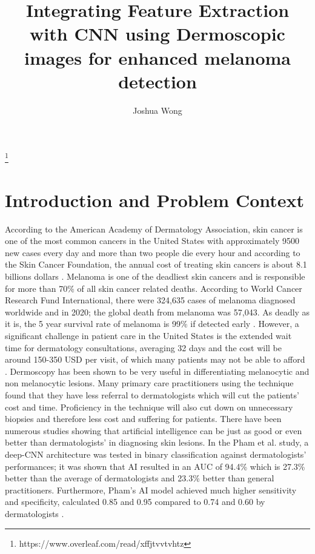 \documentclass[10pt,twocolumn]{article}
\title{Integrating Feature Extraction with CNN using Dermoscopic images for enhanced melanoma detection
}
\author{Joshua Wong}
\affiliation{Occidental College}
\begin{document}
\maketitle
\footnote{https://www.overleaf.com/read/xffjtvvtvhtz}

\section{Introduction and Problem Context}

According to the American Academy of Dermatology Association, skin cancer is one of the most common cancers in the United States with approximately 9500 new cases every day and more than two people die every hour and according to the Skin Cancer Foundation, the annual cost of treating skin cancers is about 8.1 billions dollars \cite{AmericanAcademy}.
\newline
\newline
Melanoma is one of the deadliest skin cancers and is responsible for more than 70\% of all skin cancer related deaths. According to World Cancer Research Fund International, there were 324,635 cases of melanoma diagnosed worldwide and in 2020; the global death from melanoma was 57,043. As deadly as it is, the 5 year survival rate of melanoma is 99\% if detected early \cite{MelanomaIntro}. However, a significant challenge in patient care in the United States is the extended wait time for dermatology consultations, averaging 32 days \cite{Alexander} and the cost will be around 150-350 USD per visit, of which many patients may not be able to afford \cite{MiiSkin_2023}.
\newline
\newline
Dermoscopy has been shown to be very useful in differentiating melanocytic and non melanocytic lesions. Many primary care practitioners using the technique found that they have less referral to dermatologists which will cut the patients’ cost and time. Proficiency in the technique will also cut down on unnecessary biopsies and therefore less cost and suffering for patients. 
\newline
\newline
There have been numerous studies showing that artificial intelligence can be just as good or even better than dermatologists’ in diagnosing skin lesions. In the Pham et al. study, a deep-CNN architecture was tested in binary classification against dermatologists’ performances; it was shown that AI resulted in an AUC of 94.4\% which is 27.3\% better than the average of dermatologists and 23.3\% better than general practitioners. Furthermore, Pham’s AI model achieved much higher sensitivity and specificity, calculated 0.85 and 0.95 compared to 0.74 and 0.60 by dermatologists \cite{pham2021ai}.
\end{document}
